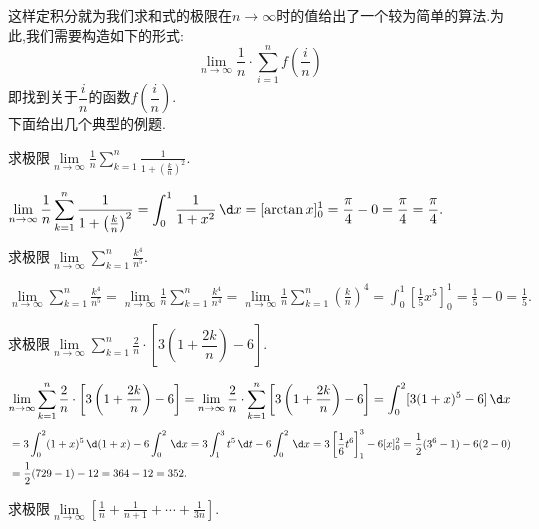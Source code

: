这样定积分就为我们求和式的极限在$n \to \infty$时的值给出了一个较为简单的算法.为此,我们需要构造如下的形式:
\begin{equation}
	\lim\limits_{n \to \infty} \frac{1}{n}\cdot \sum_{i=1}^{n}f\left(\frac{i}{n}\right)
\end{equation}
即找到关于$\dfrac{i}{n}$的函数$f\left(\dfrac{i}{n}\right)$.\\[0.5em]
下面给出几个典型的例题.

\examples 求极限$\displaystyle \lim\limits_{n \to \infty}\frac 1n \sum_{k=1}^{n}\frac{1}{1+\left( \frac{k}{n}\right)^2 }$.

\solve $\displaystyle \lim\limits_{n \to \infty}\frac 1n \sum_{k=1}^{n}\frac{1}{1+\left( \frac{k}{n}\right)^2 }=\int_{0}^{1}\frac{1}{1+x^2}\,\d x=[\arctan x]_0^1=\frac{\pi}{4}-0=\frac{\pi}{4}=\frac{\pi}{4}.$

\summarize
[
\kg 本题的被积函数为$f(x)=\dfrac{1}{1+x^2},$可以代入验证$\displaystyle f\left(\dfrac{k}{n} \right)=\dfrac{1}{1+\left(\frac{k}{n} \right)} $.
]

\examples 求极限$\displaystyle \lim\limits_{n \to \infty}\sum_{k=1}^{n}\frac{k^4}{n^5 }$.

\solve $\displaystyle \lim\limits_{n \to \infty}\sum_{k=1}^{n}\frac{k^4}{n^5 }=\lim\limits_{n \to \infty} \frac 1n \sum_{k=1}^{n}\frac{k^4}{n^4}=\lim\limits_{n \to \infty} \frac 1n \sum_{k=1}^{n}\left( \frac{k}{n}\right)^4=\int_{0}^{1}\left[\frac 15 x^5 \right]_0^1=\frac 15-0=\frac 15.$

\examples 求极限$\displaystyle \lim\limits_{n \to \infty}\sum_{k=1}^{n}\frac{2}{n}\cdot \left[3\left( 1+\dfrac{2k}{n}\right)  -6\right] $.

\solve 
$
\displaystyle
\lim\limits_{n \to \infty}\sum_{k=1}^{n}\frac{2}{n}\cdot \left[3\left( 1+\dfrac{2k}{n}\right)  -6\right]
=\lim\limits_{n \to \infty}\frac{2}{n} \cdot \sum_{k=1}^{n}\left[3\left( 1+\dfrac{2k}{n}\right)  -6\right]
=\int_{0}^{2}[3(1+x)^5-6]\,\d x
$
\begin{align*}
	&=3\int_{0}^{2}(1+x)^5\,\d(1+x)-6\int_{0}^{2}\,\d x=3\int_{1}^{3}t^5\,\d t-6\int_{0}^{2}\,\d x=3\left[\frac 16 t^6\right]_1^3-6[x]_0^2=\frac{1}{2}(3^6-1)-6(2-0)\\
	&=\frac 12(729-1)-12=364-12=352.
\end{align*}


\vspace*{-2em}
\examples 求极限$\displaystyle \lim\limits_{n \to \infty}\left[ \frac 1n +\frac {1}{n+1}+\cdots+\frac{1}{3n}\right] $.

